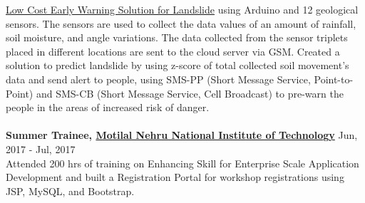 \documentclass[margin, centered]{res}
\begin{document}
\begin{resume}
            \href{http://landslidemonitoring.esy.es/}{Low Cost Early Warning Solution for Landslide} using Arduino
            and 12 geological sensors. The sensors are used to collect the data values of an amount of rainfall,
            soil moisture, and angle variations. The data collected from the sensor triplets placed in different
            locations are sent to the cloud server via GSM. Created a solution to predict landslide by using z-score
            of total collected soil movement’s data and send alert to people, using SMS-PP (Short Message Service,
            Point-to-Point) and SMS-CB (Short Message Service, Cell Broadcast) to pre-warn the people in the areas
            of increased risk of danger. \\
            \\
            \textbf{Summer Trainee, \href{http://www.mnnit.ac.in/}{Motilal Nehru National Institute of Technology}} \hfill Jun, 2017 - Jul, 2017 \\
            Attended 200 hrs of training on Enhancing Skill for Enterprise Scale Application Development and built a Registration
            Portal for workshop registrations using JSP, MySQL, and Bootstrap.



\end{resume}
\end{document}
